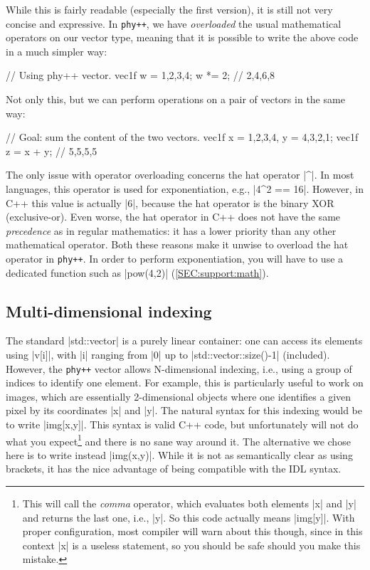 \documentclass[12pt]{report}
\newcommand{\phypp}{\texttt{phy++}\xspace}
\newcommand{\stdvec}{\cppinline|std::vector|\xspace}
\newenvironment{warning}
{
    \begin{mdframed}[style=warning,frametitle={Warning}]
}
{
    \end{mdframed}
}
\begin{document}
While this is fairly readable (especially the first version), it is still not very concise and expressive. In \phypp, we have \emph{overloaded} the usual mathematical operators on our vector type, meaning that it is possible to write the above code in a much simpler way:

\begin{cppcode}
// Using phy++ vector.
vec1f w = {1,2,3,4};
w *= 2; // {2,4,6,8}
\end{cppcode}

Not only this, but we can perform operations on a pair of vectors in the same way:
\begin{cppcode}
// Goal: sum the content of the two vectors.
vec1f x = {1,2,3,4}, y = {4,3,2,1};
vec1f z = x + y; // {5,5,5,5}
\end{cppcode}

\begin{warning}
The only issue with operator overloading concerns the hat operator \cppinline|^|. In most languages, this operator is used for exponentiation, e.g., \cppinline|4^2 == 16|. However, in C++ this value is actually \cppinline|6|, because the hat operator is the binary XOR (exclusive-or). Even worse, the hat operator in C++ does not have the same \emph{precedence} as in regular mathematics: it has a lower priority than any other mathematical operator. Both these reasons make it unwise to overload the hat operator in \phypp. In order to perform exponentiation, you will have to use a dedicated function such as \cppinline|pow(4,2)| (\ref{SEC:support:math}).
\end{warning}

\subsection{Multi-dimensional indexing \label{SEC:core:overview:multidim}}

The standard \stdvec is a purely linear container: one can access its elements using \cppinline|v[i]|, with \cppinline|i| ranging from \cppinline|0| up to \cppinline|std::vector::size()-1| (included). However, the \phypp vector allows N-dimensional indexing, i.e., using a group of indices to identify one element. For example, this is particularly useful to work on images, which are essentially 2-dimensional objects where one identifies a given pixel by its coordinates \cppinline|x| and \cppinline|y|. The natural syntax for this indexing would be to write \cppinline|img[x,y]|. This syntax is valid C++ code, but unfortunately will not do what you expect\footnote{This will call the \emph{comma} operator, which evaluates both elements \cppinline|x| and \cppinline|y| and returns the last one, i.e., \cppinline|y|. So this code actually means \cppinline|img[y]|. With proper configuration, most compiler will warn about this though, since in this context \cppinline|x| is a useless statement, so you should be safe should you make this mistake.} and there is no sane way around it. The alternative we chose here is to write instead \cppinline|img(x,y)|. While it is not as semantically clear as using brackets, it has the nice advantage of being compatible with the IDL syntax.
\end{document}
